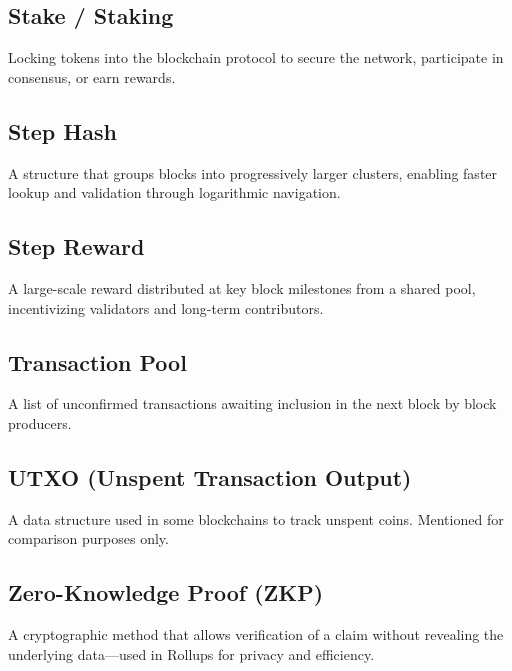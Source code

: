 \documentclass{article}
\begin{document}
\subsection*{Stake / Staking}
Locking tokens into the blockchain protocol to secure the network, participate in consensus, or earn rewards.

\subsection*{Step Hash}
A structure that groups blocks into progressively larger clusters, enabling faster lookup and validation through logarithmic navigation.

\subsection*{Step Reward}
A large-scale reward distributed at key block milestones from a shared pool, incentivizing validators and long-term contributors.

\subsection*{Transaction Pool}
A list of unconfirmed transactions awaiting inclusion in the next block by block producers.

\subsection*{UTXO (Unspent Transaction Output)}
A data structure used in some blockchains to track unspent coins. Mentioned for comparison purposes only.

\subsection*{Zero-Knowledge Proof (ZKP)}
A cryptographic method that allows verification of a claim without revealing the underlying data—used in Rollups for privacy and efficiency.
\end{document}

